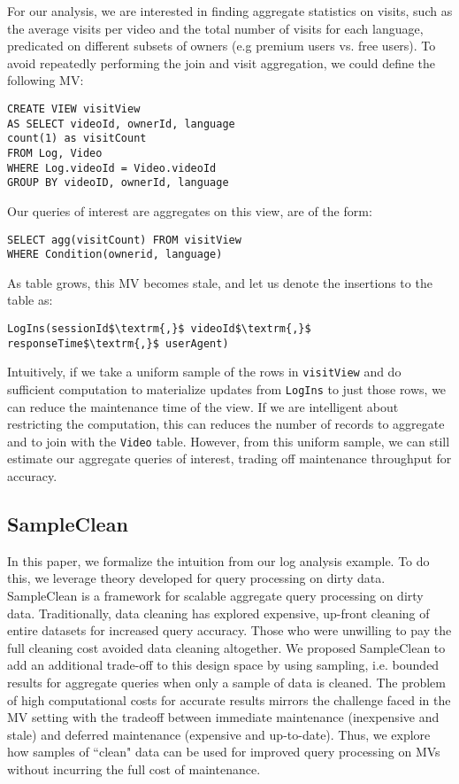 For our analysis, we are interested in finding aggregate statistics on visits, such as the average visits per video and the total number of visits for each language, predicated on different subsets of owners (e.g premium users vs. free users). 
To avoid repeatedly performing the join and visit aggregation, we could define the following MV:
\begin{lstlisting}[mathescape,basicstyle={\scriptsize}]
CREATE VIEW visitView
AS SELECT videoId, ownerId, language
count(1) as visitCount
FROM Log, Video
WHERE Log.videoId = Video.videoId
GROUP BY videoID, ownerId, language
\end{lstlisting}
Our queries of interest are aggregates on this view, are of the form:
\begin{lstlisting}[mathescape,basicstyle={\scriptsize}]
SELECT agg(visitCount) FROM visitView 
WHERE Condition(ownerid, language)
\end{lstlisting}

As  table grows, this MV becomes stale, and let us denote the insertions to the table as:
\begin{lstlisting}[mathescape,basicstyle={\scriptsize}]
LogIns(sessionId$\textrm{,}$ videoId$\textrm{,}$ responseTime$\textrm{,}$ userAgent)
\end{lstlisting}
Intuitively, if we take a uniform sample of the rows in \texttt{visitView} and do sufficient computation to materialize updates from \texttt{LogIns} to just those rows, we can reduce the maintenance time of the view.
If we are intelligent about restricting the computation, this can reduces the number of  records to aggregate and to join with the \texttt{Video} table.
However, from this uniform sample, we can still estimate our aggregate queries of interest, trading off maintenance throughput for accuracy.

\subsection{SampleClean~\cite{wang1999sample}}
In this paper, we formalize the intuition from our log analysis example. 
To do this, we leverage theory developed for query processing on dirty data.
SampleClean is a framework for scalable aggregate query processing on dirty data.
Traditionally, data cleaning has explored expensive, up-front cleaning of entire datasets for increased query accuracy.
Those who were unwilling to pay the full cleaning cost avoided data cleaning altogether.
We proposed SampleClean to add an additional trade-off to this design space by using sampling, i.e. bounded results for aggregate queries when only a sample of data is cleaned.
The problem of high computational costs for accurate results mirrors the challenge faced in the MV setting with the tradeoff between immediate maintenance (inexpensive and stale) and deferred maintenance (expensive and up-to-date).
Thus, we explore how samples of ``clean" data can be used for improved query processing on MVs without incurring the full cost of maintenance.

